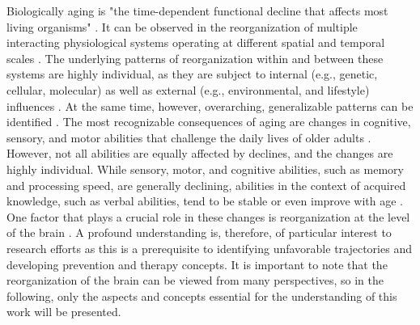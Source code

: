 Biologically aging is "the time-dependent functional decline that affects most living organisms" \cite{López-Otín2013}. It can be observed in the reorganization of multiple interacting physiological systems operating at different spatial and temporal scales \cite{Mooney2016}. The underlying patterns of reorganization within and between these systems are highly individual, as they are subject to internal (e.g., genetic, cellular, molecular) as well as external (e.g., environmental, and lifestyle) influences \cite{Smith2020, Mooney2016, Cohen2022}. At the same time, however, overarching, generalizable patterns can be identified \cite{Salthouse2019}. The most recognizable consequences of aging are changes in cognitive, sensory, and motor abilities that challenge the daily lives of older adults \cite{Li2002}. However, not all abilities are equally affected by declines, and the changes are highly individual. While sensory, motor, and cognitive abilities, such as memory and processing speed, are generally declining, abilities in the context of acquired knowledge, such as verbal abilities, tend to be stable or even improve with age \cite{Park2009}. One factor that plays a crucial role in these changes is reorganization at the level of the brain \cite{Reuter-Lorenz2010}. A profound understanding is, therefore, of particular interest to research efforts as this is a prerequisite to identifying unfavorable trajectories and developing prevention and therapy concepts. It is important to note that the reorganization of the brain can be viewed from many perspectives, so in the following, only the aspects and concepts essential for the understanding of this work will be presented. 

